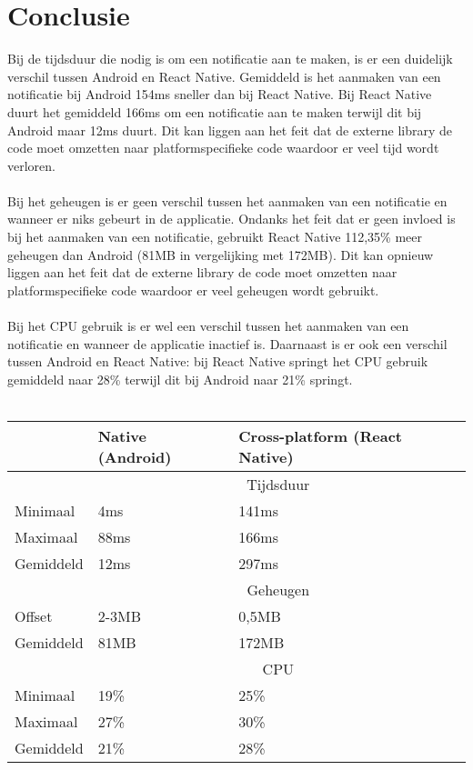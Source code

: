 \section{Conclusie}
Bij de tijdsduur die nodig is om een notificatie aan te maken, is er een duidelijk 
verschil tussen Android en React Native. Gemiddeld is het aanmaken van een notificatie bij Android
154ms sneller dan bij React Native. Bij React Native duurt het gemiddeld 166ms om een notificatie 
aan te maken terwijl dit bij Android maar 12ms duurt. Dit kan liggen aan het feit dat de externe 
library de code moet omzetten naar platformspecifieke code waardoor er veel tijd wordt verloren.
\\\\
Bij het geheugen is er geen verschil tussen het aanmaken van een notificatie en wanneer er 
niks gebeurt in de applicatie. Ondanks het feit dat er geen invloed is bij het aanmaken van een notificatie, 
gebruikt React Native 112,35\% meer geheugen dan Android (81MB in vergelijking met 172MB). 
Dit kan opnieuw liggen aan het feit dat de externe library
de code moet omzetten naar platformspecifieke code waardoor er veel geheugen wordt gebruikt.
\\\\
Bij het CPU gebruik is er wel een verschil tussen het aanmaken van een notificatie en wanneer de 
applicatie inactief is. Daarnaast is er ook een verschil tussen Android en React Native: bij React Native 
springt het CPU gebruik gemiddeld naar 28\% terwijl dit bij Android naar 21\% springt.
\\\\
\begin{tabular}{ |p{3cm}||p{4cm}|p{4cm}| }
    \hline
     & Native (Android) & Cross-platform (React Native) \\
    \hline
     & \multicolumn{2}{|c|}{Tijdsduur} \\
    \hline
    Minimaal & 4ms & 141ms \\
    Maximaal & 88ms & 166ms \\
    Gemiddeld & 12ms & 297ms \\
    \hline
     & \multicolumn{2}{|c|}{Geheugen} \\ 
    \hline
    Offset & 2-3MB & 0,5MB \\
    Gemiddeld & 81MB & 172MB \\
    \hline
     & \multicolumn{2}{|c|}{CPU} \\
    \hline
    Minimaal & 19\% & 25\% \\
    Maximaal & 27\% & 30\% \\
    Gemiddeld & 21\% & 28\% \\
    \hline
\end{tabular}
